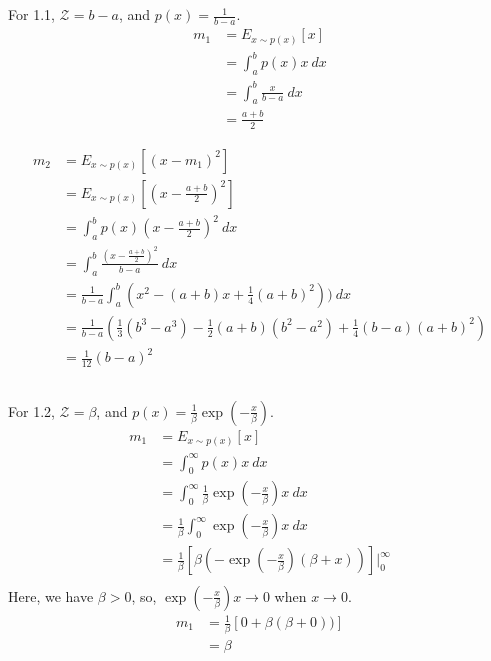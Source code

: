 \subsection{}
For 1.1, $\mathcal{Z}=b-a$, and $p(x)=\frac{1}{b-a}$.
\begin{align*}
    m_1 &= E_{x \sim p(x)}[x] \\
    &= \int_a^b p(x) x \ dx\\
    &= \int_a^b \frac{x}{b-a} \ dx\\
    &= \frac{a+b}{2}
\end{align*}

\begin{align*}
    m_2 &= E_{x \sim p(x)}[(x-m_1)^2] \\
    &= E_{x \sim p(x)}[(x-\frac{a+b}{2})^2] \\
    &= \int_a^b p(x) (x-\frac{a+b}{2})^2 \ dx\\
    &= \int_a^b \frac{(x-\frac{a+b}{2})^2}{b-a}  \ dx\\
    &= \frac{1}{b-a} \int_a^b (x^2 - (a+b)x + \frac{1}{4}(a+b)^2) )  \ dx\\
    &= \frac{1}{b-a} (\frac{1}{3}(b^3-a^3) - \frac{1}{2}(a+b)(b^2-a^2) + \frac{1}{4}(b-a)(a+b)^2) \\
    &= \frac{1}{12} (b-a)^2
\end{align*}

\subsection{}
For 1.2, $\mathcal{Z}=\beta$, and $p(x)=\frac{1}{\beta} \exp(-\frac{x}{\beta})$.
\begin{align*}
    m_1 &= E_{x \sim p(x)}[x] \\
    &= \int_0^{\infty} p(x) x \ dx\\
    &= \int_0^{\infty} \frac{1}{\beta} \exp(-\frac{x}{\beta}) x \ dx\\
    &= \frac{1}{\beta} \int_0^{\infty} \exp(-\frac{x}{\beta}) x \ dx\\
    &= \frac{1}{\beta} [\beta (-\exp(-\frac{x}{\beta})(\beta+x))] \biggr\rvert _0^{\infty} \\
\end{align*}
Here, we have $\beta>0$, so, $\exp(-\frac{x}{\beta}) x \rightarrow 0$ when $x \rightarrow 0$.
\begin{align*}
    m_1 &= \frac{1}{\beta} [0 + \beta (\beta+0))] \\
    &= \beta
\end{align*}

